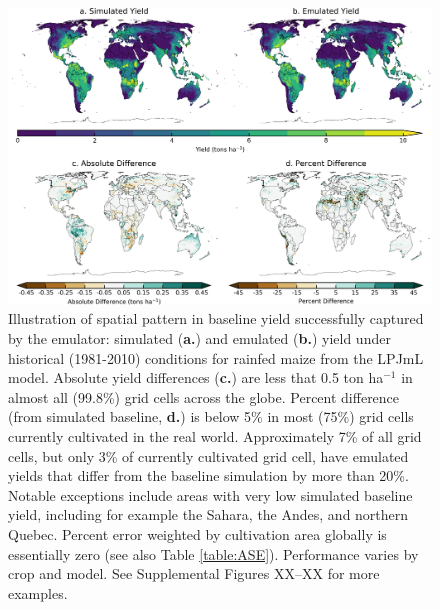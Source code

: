 \documentclass[gmd, manuscript]{copernicus} %
\begin{document}
\begin{figure}[ht]
\centering
    \includegraphics[width=16.0cm]{figures/lpjml_maize.png}
    \caption{
    Illustration of spatial pattern in baseline yield successfully captured by the emulator:
    simulated (\textbf{a.}) and emulated (\textbf{b.}) yield under historical (1981-2010) conditions for rainfed maize from the LPJmL model.
    Absolute yield differences (\textbf{c.}) are less that 0.5 ton ha$^{-1}$ in almost all (99.8\%) grid cells across the globe.
    Percent difference (from simulated baseline, \textbf{d.}) is below 5\% in most (75\%) grid cells currently cultivated in the real world.
    Approximately 7\% of all grid cells, but only 3\% of currently cultivated grid cell, have emulated yields that differ from the baseline simulation by more than 20\%.
    Notable exceptions include areas with very low simulated baseline yield, including for example the Sahara, the Andes, and northern Quebec. 
    Percent error weighted by cultivation area globally is essentially zero (see also Table \ref{table:ASE}).
    Performance varies by crop and model. 
    See Supplemental Figures XX--XX for more examples.
    }
   \label{fig:map_pattern}
\end{figure}
\end{document}
